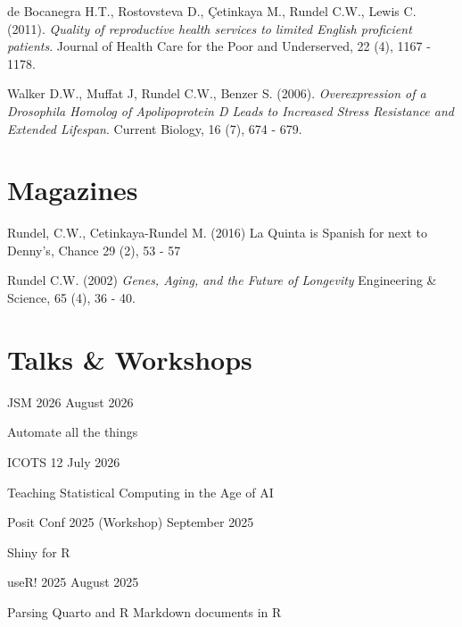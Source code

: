 \documentclass[margin,line]{res}
\begin{document}
\begin{resume}
\vspace{-0.15cm}
de Bocanegra H.T., Rostovsteva D., \c{C}etinkaya M., Rundel C.W., Lewis C. (2011). {\em Quality of reproductive health services to limited English proficient patients}. Journal of Health Care for the Poor and Underserved, 22 (4), 1167 - 1178.

\vspace{-0.15cm}
Walker D.W., Muffat J, Rundel C.W., Benzer S. (2006). {\em Overexpression of a Drosophila Homolog of Apolipoprotein D Leads to Increased Stress Resistance and Extended Lifespan}. Current Biology, 16 (7), 674 - 679.


\pagebreak

\section{\sc Magazines}

Rundel, C.W., Cetinkaya-Rundel M. (2016) La Quinta is Spanish for next to Denny's, Chance 29 (2), 53 - 57


Rundel C.W. (2002) {\em Genes, Aging, and the Future of Longevity} Engineering \& Science, 65 (4), 36 - 40.

\vspace{4mm}


\section{\sc Talks \& Workshops}

JSM 2026 \hfill August 2026
\begin{list1}
\item[] Automate all the things
\end{list1}
\vspace{-3mm}

ICOTS 12 \hfill July 2026
\begin{list1}
\item[] Teaching Statistical Computing in the Age of AI
\end{list1}
\vspace{-3mm}

Posit Conf 2025 (Workshop) \hfill September 2025
\begin{list1}
\item[] Shiny for R
\end{list1}
\vspace{-3mm}

useR! 2025 \hfill August 2025
\begin{list1}
\item[] Parsing Quarto and R Markdown documents in R
\end{list1}
\vspace{-3mm}


\end{resume}
\end{document}
